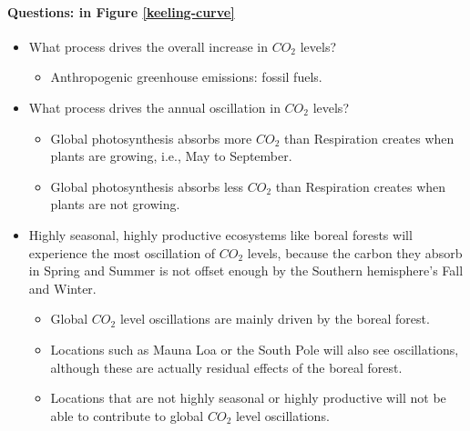 \documentclass[12pt]{article}
\begin{document}
\paragraph{Questions: in Figure \ref{keeling-curve}}
\begin{itemize}
    \item What process drives the overall increase in $CO_2$ levels?
          \begin{itemize}
              \item Anthropogenic greenhouse emissions: fossil fuels.
          \end{itemize}
    \item What process drives the annual oscillation in $CO_2$ levels?
          \begin{itemize}
              \item Global photosynthesis absorbs more $CO_2$ than Respiration creates when plants are growing, i.e., May to September.
              \item Global photosynthesis absorbs less $CO_2$ than Respiration creates when plants are not growing.
          \end{itemize}
    \item Highly seasonal, highly productive ecosystems like boreal forests will experience the most oscillation of $CO_2$ levels, because the carbon they absorb in Spring and Summer is not offset enough by the Southern hemisphere's Fall and Winter.
          \begin{itemize}
              \item Global $CO_2$ level oscillations are mainly driven by the boreal forest.
              \item Locations such as Mauna Loa or the South Pole will also see oscillations, although these are actually residual effects of the boreal forest.
              \item Locations that are not highly seasonal or highly productive will not be able to contribute to global $CO_2$ level oscillations.
          \end{itemize}
\end{itemize}
\end{document}
